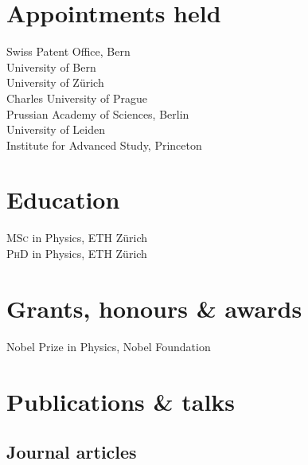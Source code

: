 \documentclass[11pt]{article} %
\begin{document}
\section*{Appointments held}

Swiss Patent Office, Bern\\
University of Bern\\
University of Zürich\\
Charles University of Prague\\
Prussian Academy of Sciences, Berlin\\
University of Leiden\\
Institute for Advanced Study, Princeton


\section*{Education}

\textsc{MSc} in Physics, ETH Zürich\\
\textsc{PhD} in Physics, ETH Zürich


\section*{Grants, honours \& awards}

Nobel Prize in Physics, Nobel Foundation


\section*{Publications \& talks}

\subsection*{Journal articles}
\end{document}
